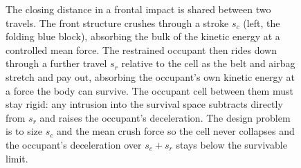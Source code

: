 \begin{figure}[htbp]
\begin{tikzpicture}
\end{tikzpicture}
\caption[Crash survival space: crush stroke shared with occupant
ride-down]{The closing distance in a frontal impact is shared between two
travels. The front structure crushes through a stroke $s_c$ (left, the
folding blue block), absorbing the bulk of the kinetic energy at a
controlled mean force. The restrained occupant then rides down through a
further travel $s_r$ relative to the cell as the belt and airbag stretch
and pay out, absorbing the occupant's own kinetic energy at a force the
body can survive. The occupant cell between them must stay rigid: any
intrusion into the survival space subtracts directly from $s_r$ and raises
the occupant's deceleration. The design problem is to size $s_c$ and the
mean crush force so the cell never collapses and the occupant's
deceleration over $s_c + s_r$ stays below the survivable limit.}
\label{fig:vol03ch05:crumple-survival-space}
\end{figure}
